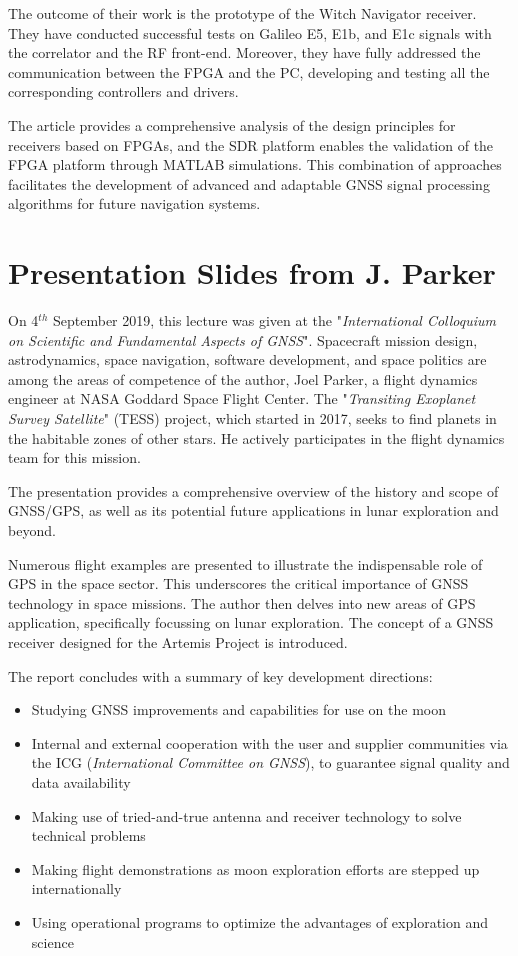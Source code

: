 The outcome of their work is the prototype of the Witch Navigator receiver. They have conducted successful tests on Galileo E5, E1b, and E1c signals with the correlator and the RF front-end. Moreover, they have fully addressed the communication between the FPGA and the PC, developing and testing all the corresponding controllers and drivers.

The article provides a comprehensive analysis of the design principles for receivers based on FPGAs, and the SDR platform enables the validation of the FPGA platform through MATLAB simulations. This combination of approaches facilitates the development of advanced and adaptable GNSS signal processing algorithms for future navigation systems.

\section{Presentation Slides from J. Parker\texorpdfstring{\cite{RN146}}{}}
On 4$^{th}$ September 2019, this lecture was given at the "\textit{International Colloquium on Scientific and Fundamental Aspects of GNSS}". Spacecraft mission design, astrodynamics, space navigation, software development, and space politics are among the areas of competence of the author, Joel Parker, a flight dynamics engineer at NASA Goddard Space Flight Center. The "\textit{Transiting Exoplanet Survey Satellite}" (TESS) project, which started in 2017, seeks to find planets in the habitable zones of other stars. He actively participates in the flight dynamics team for this mission.

The presentation provides a comprehensive overview of the history and scope of GNSS/GPS, as well as its potential future applications in lunar exploration and beyond.

Numerous flight examples are presented to illustrate the indispensable role of GPS in the space sector. This underscores the critical importance of GNSS technology in space missions. The author then delves into new areas of GPS application, specifically focussing on lunar exploration. The concept of a GNSS receiver designed for the Artemis Project is introduced.

The report concludes with a summary of key development directions:
\begin{itemize}
    \item Studying GNSS improvements and capabilities for use on the moon
    \item Internal and external cooperation with the user and supplier communities via the ICG (\textit{International Committee on GNSS}), to guarantee signal quality and data availability
    \item Making use of tried-and-true antenna and receiver technology to solve technical problems
    \item Making flight demonstrations as moon exploration efforts are stepped up internationally
    \item Using operational programs to optimize the advantages of exploration and science
\end{itemize}

